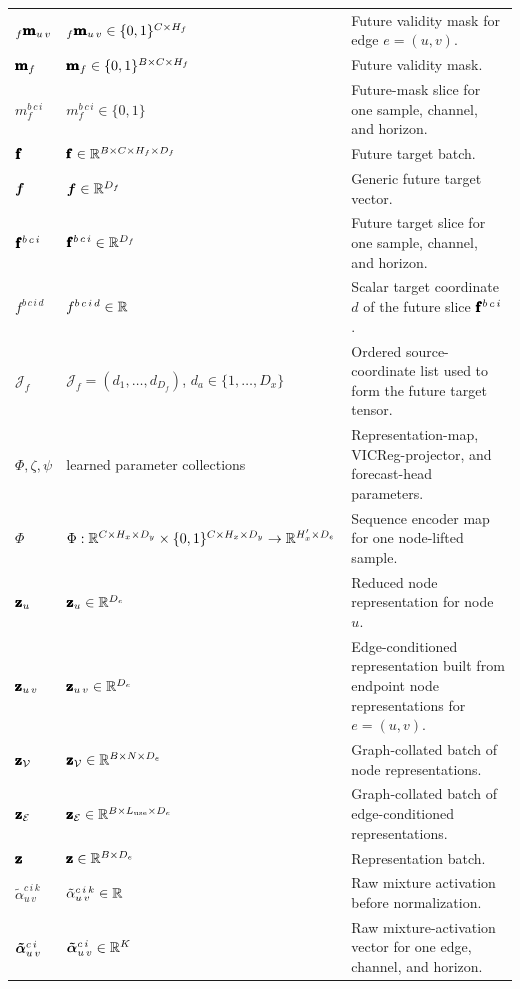 \begin{center}
\begin{longtable}{>{\raggedright\arraybackslash}p{}
                  >{\raggedright\arraybackslash}p{}
                  >{\raggedright\arraybackslash}p{}}
${}_{f}\pmb{\mathbf{m}}_{u\,v}$ & ${}_{f}\pmb{\mathbf{m}}_{u\,v} \in \{0,1\}^{C \times H_f}$ & Future validity mask for edge $e=(u,v)$. \\
$\pmb{\mathbf{m}}_f$ & $\pmb{\mathbf{m}}_f \in \{0,1\}^{B \times C \times H_f}$ & Future validity mask. \\
$m_f^{b\,c\,i}$ & $m_f^{b\,c\,i} \in \{0,1\}$ & Future-mask slice for one sample, channel, and horizon. \\
$\pmb{\mathbf{f}}$ & $\pmb{\mathbf{f}} \in \mathbb{R}^{B \times C \times H_f \times D_f}$ & Future target batch. \\
$\bm{f}$ & $\bm{f} \in \mathbb{R}^{D_f}$ & Generic future target vector. \\
$\pmb{\mathbf{f}}^{b\,c\,i}$ & $\pmb{\mathbf{f}}^{b\,c\,i} \in \mathbb{R}^{D_f}$ & Future target slice for one sample, channel, and horizon. \\
$f^{b\,c\,i\,d}$ & $f^{b\,c\,i\,d} \in \mathbb{R}$ & Scalar target coordinate $d$ of the future slice $\pmb{\mathbf{f}}^{b\,c\,i}$. \\
$\mathcal{J}_f$ & $\mathcal{J}_f=(d_1,\ldots,d_{D_f})$, $d_a\in\{1,\ldots,D_x\}$ & Ordered source-coordinate list used to form the future target tensor. \\
\midrule
$\Phi,\zeta,\psi$ & learned parameter collections & Representation-map, VICReg-projector, and forecast-head parameters. \\
$\Phi$ & $\Phi:\mathbb{R}^{C \times H_x \times D_y}\times\{0,1\}^{C \times H_x\times D_y}\rightarrow\mathbb{R}^{H_x' \times D_e}$ & Sequence encoder map for one node-lifted sample. \\
$\pmb{\mathbf{z}}_{u}$ & $\pmb{\mathbf{z}}_{u}\in\mathbb{R}^{D_e}$ & Reduced node representation for node $u$. \\
$\pmb{\mathbf{z}}_{u\,v}$ & $\pmb{\mathbf{z}}_{u\,v}\in\mathbb{R}^{D_e}$ & Edge-conditioned representation built from endpoint node representations for $e=(u,v)$. \\
$\pmb{\mathbf{z}}_{\mathcal{V}}$ & $\pmb{\mathbf{z}}_{\mathcal{V}}\in\mathbb{R}^{B\times N\times D_e}$ & Graph-collated batch of node representations. \\
$\pmb{\mathbf{z}}_{\mathcal{E}}$ & $\pmb{\mathbf{z}}_{\mathcal{E}}\in\mathbb{R}^{B\times L_{\mathrm{use}}\times D_e}$ & Graph-collated batch of edge-conditioned representations. \\
$\pmb{\mathbf{z}}$ & $\pmb{\mathbf{z}} \in \mathbb{R}^{B \times D_e}$ & Representation batch. \\
\midrule
$\tilde{\alpha}_{u\,v}^{c\,i\,k}$ & $\tilde{\alpha}_{u\,v}^{c\,i\,k} \in \mathbb{R}$ & Raw mixture activation before normalization. \\
$\bm{\tilde{\alpha}}_{u\,v}^{c\,i}$ & $\bm{\tilde{\alpha}}_{u\,v}^{c\,i}\in\mathbb{R}^K$ & Raw mixture-activation vector for one edge, channel, and horizon. \\

\end{longtable}
\end{center}
